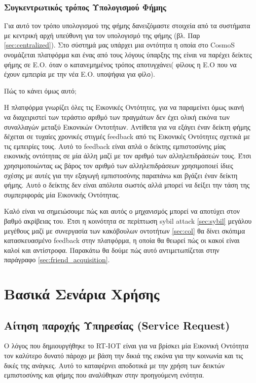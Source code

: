 \subsubsection{Συγκεντρωτικός τρόπος Υπολογισμού Φήμης}

Για αυτό τον τρόπο υπολογισμού της φήμης δανειζόμαστε στοιχεία από τα συστήματα με κεντρική αρχή υπεύθυνη για τον υπολογισμό της φήμης (βλ. Παρ \ref{sec:centralized}). Στο σύστημά μας υπάρχει μια οντότητα η οποία στο CosmoS ονομάζεται πλατφόρμα και ένας από τους λόγους ύπαρξης της είναι να παρέχει δείκτες φήμης σε Ε.Ο. όταν ο κατανεμημένος τρόπος αποτυγχάνει( φίλους η Ε.Ο που να έχουν εμπειρία με την νέα Ε.Ο. υποψήφια για φίλο).

Πώς το κάνει όμως αυτό;

Η πλατφόρμα γνωρίζει όλες τις Εικονικές Οντότητες, για να παραμείνει όμως ικανή να διαχειριστεί των τεράστιο αριθμό των πραγμάτων δεν έχει ολική εικόνα των συναλλαγών μεταξύ Εικονικών Οντοτήτων. Αντίθετα για να εξάγει έναν δείκτη φήμης δέχεται σε τυχαίες χρονικές στιγμές feedback από τις Εικονικές Οντότητες σχετικά με τις εμπειρίες τους. Αυτό το feedback είναι απλά ο δείκτης εμπιστοσύνης μίας εικονικής οντότητας σε μία άλλη μαζί με τον αριθμό των αλληλεπιδράσεών τους. Έτσι χρησιμοποιώντας ως βάρος τον αριθμό των αλληλεπιδράσεων χρησιμοποιεί ίδιες σχέσης με αυτές για την εξαγωγή εμπιστοσύνης παραπάνω και βγάζει έναν δείκτη φήμης. Αυτό ο δείκτης δεν είναι απόλυτα σωστός αλλά μπορεί να δείξει την τάση της συμπεριφοράς μία Εικονικής Οντότητας.

Καλό είναι να σημειώσουμε πώς και αυτός ο μηχανισμός μπορεί να αποτύχει στον βαθμό ακρίβειας του. Έτσι η κοινότητα σε περίπτωση sybil attack \ref{sec:sybil} μεγάλου μεγέθους μαζί με συνεργασία των κακόβουλων οντοτήτων \ref{sec:col} θα δίνει σκόπιμα κατασκευασμένο feedback στην πλατφόρμα, η οποία θα θεωρεί πώς οι κακοί είναι καλοί και αντίστροφα. Παρακάτω θα δούμε πώς αυτό αντιμετωπίζεται  στην παράγραφο \ref{sec:friend_acquisition}.
\newpage
\section{Βασικά Σενάρια Χρήσης}

\subsection{Αίτηση παροχής Υπηρεσίας (Service Request)}\label{sec:ser_req}

Ο λόγος που δημιουργήθηκε το RT-IOT είναι για να βρίσκει μία Εικονική Οντότητα τον καλύτερο δυνατό πάροχο με βάση την δικιά της εικόνα για την κοινωνία και τις δικές της ανάγκες. Αυτό το καταφέρνει αποδοτικά με την χρήση των δεικτών εμπιστοσύνης και φήμης που αναλύθηκαν στην προηγούμενη ενότητα.

